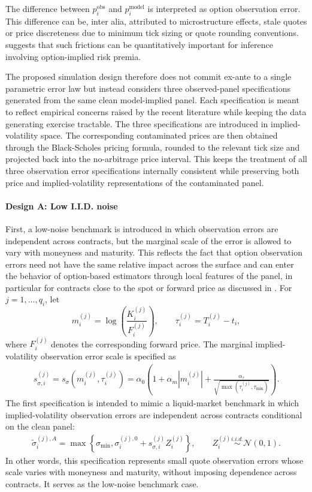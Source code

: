 \documentclass[11pt,a4paper,notitlepage]{article}
\numberwithin{equation}{section}
\begin{document}
The difference between $p_i^{\mathrm{obs}}$ and $p_i^{\mathrm{model}}$ is interpreted as option observation error.
This difference can be, inter alia, attributed to microstructure effects, stale quotes or price discreteness due to minimum tick sizing or quote rounding conventions. \citet{duarte2024very}
suggests that such frictions can be quantitatively important for inference involving option-implied risk premia. 

The proposed simulation design therefore does not commit ex-ante to a single parametric error law but instead considers three observed-panel specifications generated from the same clean model-implied panel. Each specification is meant to reflect empirical concerns raised by the recent literature while keeping the data generating exercise tractable. The three specifications are introduced in implied-volatility space. The corresponding contaminated prices are then obtained through the Black-Scholes pricing formula, rounded to the relevant tick size and projected back into the no-arbitrage price interval. This keeps the treatment of all three observation error specifications internally consistent while preserving both price and implied-volatility representations of the contaminated panel.

\paragraph{Design A: Low I.I.D. noise}
First, a low-noise benchmark is introduced in which observation errors are independent across contracts, but the marginal scale of the error is allowed to vary with moneyness and maturity. This reflects the fact that option observation errors need not have the same relative impact across the surface and can enter the behavior of option-based estimators through local features of the panel, in particular for contracts close to the spot or forward price as discussed in \cite{chongtodorov2024vov}.
For $j=1,\ldots,q_i$, let
\[
m_i^{(j)}=\log\left(\frac{K_i^{(j)}}{F_i^{(j)}}\right),
\qquad
\tau_i^{(j)}=T_i^{(j)}-t_i,
\]
where $F_i^{(j)}$ denotes the corresponding forward price. The marginal implied-volatility observation error scale is specified as
\begin{align}
s_{\sigma,i}^{(j)}
=
s_\sigma(m_i^{(j)},\tau_i^{(j)})
=
\alpha_0\left(
1+\alpha_m |m_i^{(j)}|
+\frac{\alpha_\tau}{\sqrt{\max(\tau_i^{(j)},\tau_{\min})}}
\right).
\label{eq:iv_error_scale}
\end{align}
The first specification is intended to mimic a liquid-market benchmark in which implied-volatility observation errors are independent across contracts conditional on the clean panel:
\begin{align}
\tilde\sigma_i^{(j),A}
=
\max\left\{
\sigma_{\min},
\sigma_i^{(j),0}
+
s_{\sigma,i}^{(j)}Z_i^{(j)}
\right\},
\qquad
Z_i^{(j)}\overset{i.i.d.}{\sim}\mathcal{N}(0,1).
\label{eq:noise_liquid}
\end{align}
In other words, this specification represents small quote observation errors whose scale varies with moneyness and maturity, without imposing dependence across contracts. It serves as the low-noise benchmark case.
\end{document}
